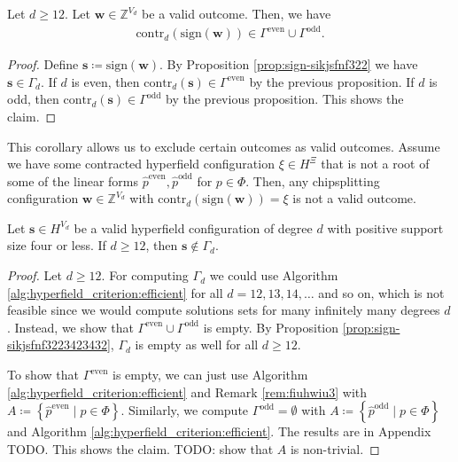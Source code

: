 \begin{corollary}\label{cor:validwunfwufneuiw}
    Let \( d \geq 12 \). Let \( \mathbf{w} \in \mathbb{Z}^{V_d} \) be a valid outcome. Then, we have 
    \begin{align*}
        \mathrm{contr}_d(\mathrm{sign}(\mathbf{w})) \in \Gamma^{\mathrm{even}} \cup \Gamma^{\mathrm{odd}}.
    \end{align*}
\end{corollary}

\begin{proof}
    Define \( \mathbf{s} \coloneqq \mathrm{sign}(\mathbf{w}) \). By Proposition \ref{prop:sign-sikjsfnf322} we have \( \mathbf{s} \in \Gamma_d \). If \( d \) is even, then \( \mathrm{contr}_d(\mathbf{s}) \in \Gamma^{\mathrm{even}} \) by the previous proposition. If \( d \) is odd, then \( \mathrm{contr}_d(\mathbf{s}) \in \Gamma^{\mathrm{odd}} \) by the previous proposition. This shows the claim.
\end{proof}

This corollary allows us to exclude certain outcomes as valid outcomes. Assume we have some contracted hyperfield configuration \( \xi \in H^{\Xi} \) that is not a root of some of the linear forms \( \hat p^{\mathrm{even}}, \hat p^{\mathrm{odd}} \) for \( p \in \Phi \). Then, any chipsplitting configuration \( \mathbf{w} \in \mathbb{Z}^{V_d} \) with \( \mathrm{contr}_d( \mathrm{sign}(\mathbf{w})) = \xi \) is not a valid outcome.

\begin{proposition}\label{prop:jasndkjsnjsnkjs}
    Let \( \mathbf{s} \in H^{V_d} \) be a valid hyperfield configuration of degree \( d \) with positive support size four or less. If \( d\geq 12 \), then \( \mathbf{s} \notin \Gamma_d \).
\end{proposition}

\begin{proof}
    Let \( d \geq 12 \). For computing \( \Gamma_d \) we could use Algorithm \ref{alg:hyperfield_criterion:efficient} for all \( d = 12, 13, 14, \dots \) and so on, which is not feasible since we would compute solutions sets for many infinitely many degrees \( d \). Instead, we show that \( \Gamma^{\mathrm{even}} \cup \Gamma^{\mathrm{odd}} \) is empty. By Proposition \ref{prop:sign-sikjsfnf3223423432}, \( \Gamma_d \) is empty as well for all \( d\geq 12 \).

    To show that \(  \Gamma^{\mathrm{even}} \) is empty, we can just use Algorithm \ref{alg:hyperfield_criterion:efficient} and Remark \ref{rem:fiuhwiu3} with \(A \coloneqq \left\{ \hat p^{\mathrm{even}} \mid p \in \Phi \right\}\). Similarly, we compute \( \Gamma^{\mathrm{odd}} = \emptyset \) with \(A \coloneqq \left\{ \hat p^{\mathrm{odd}} \mid p \in \Phi \right\}\) and Algorithm \ref{alg:hyperfield_criterion:efficient}. The results are in Appendix TODO. This shows the claim. TODO: show that \( A \) is non-trivial.
\end{proof}

